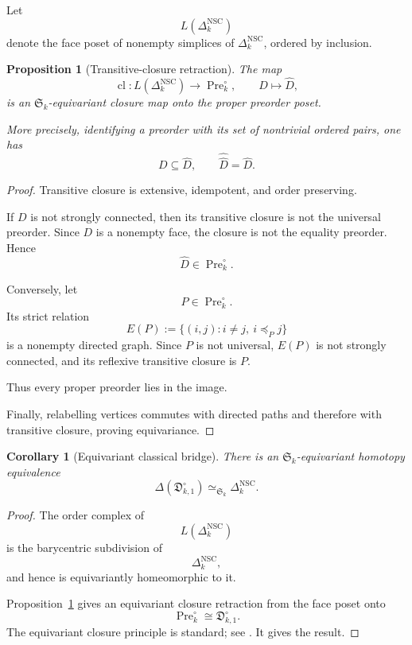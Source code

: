 \documentclass[11pt]{article}
\theoremstyle{plain}
\newtheorem{proposition}[theorem]{Proposition}
\newtheorem{corollary}[theorem]{Corollary}
\theoremstyle{definition}
\begin{document}
Let
\[
L(\Delta_k^{\mathrm{NSC}})
\]
denote the face poset of nonempty simplices of
$\Delta_k^{\mathrm{NSC}}$, ordered by inclusion.

\begin{proposition}[Transitive-closure retraction]
\label{prop:NSC-preorder-closure}
The map
\[
\operatorname{cl}:
L(\Delta_k^{\mathrm{NSC}})
\longrightarrow
\operatorname{Pre}_k^\circ,
\qquad
D\longmapsto\widehat D,
\]
is an $\mathfrak S_k$-equivariant closure map onto the proper preorder
poset.

More precisely, identifying a preorder with its set of nontrivial
ordered pairs, one has
\[
D\subseteq\widehat D,
\qquad
\widehat{\widehat D}=\widehat D.
\]
\end{proposition}

\begin{proof}
Transitive closure is extensive, idempotent, and order preserving.

If $D$ is not strongly connected, then its transitive closure is not the
universal preorder.  Since $D$ is a nonempty face, the closure is not
the equality preorder.  Hence
\[
\widehat D\in\operatorname{Pre}_k^\circ.
\]

Conversely, let
\[
P\in\operatorname{Pre}_k^\circ.
\]
Its strict relation
\[
E(P)
:=
\{(i,j):i\neq j,\ i\preceq_P j\}
\]
is a nonempty directed graph.  Since $P$ is not universal, $E(P)$ is not
strongly connected, and its reflexive transitive closure is $P$.

Thus every proper preorder lies in the image.

Finally, relabelling vertices commutes with directed paths and therefore
with transitive closure, proving equivariance.
\end{proof}

\begin{corollary}[Equivariant classical bridge]
\label{cor:equivariant-classical-bridge}
There is an $\mathfrak S_k$-equivariant homotopy equivalence
\[
\Delta(
\mathfrak D_{k,1}^{\circ}
)
\simeq_{\mathfrak S_k}
\Delta_k^{\mathrm{NSC}}.
\]
\end{corollary}

\begin{proof}
The order complex of
\[
L(\Delta_k^{\mathrm{NSC}})
\]
is the barycentric subdivision of
\[
\Delta_k^{\mathrm{NSC}},
\]
and hence is equivariantly homeomorphic to it.

Proposition~\ref{prop:NSC-preorder-closure} gives an equivariant closure
retraction from the face poset onto
\[
\operatorname{Pre}_k^\circ
\cong
\mathfrak D_{k,1}^{\circ}.
\]
The equivariant closure principle is standard; see \citet{ThevenazWebb1991}.  It gives the result.
\end{proof}
\end{document}
